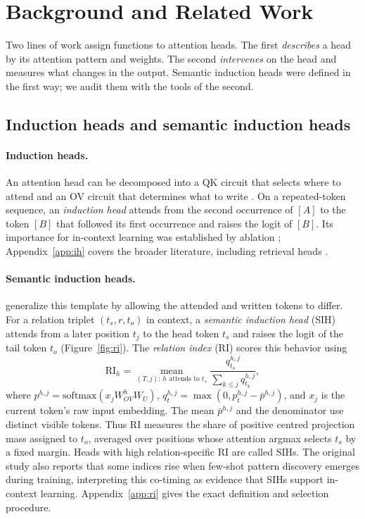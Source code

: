 \section{Background and Related Work}
\label{sec:background}

Two lines of work assign functions to attention heads. The first \emph{describes} a
head by its attention pattern and weights. The second \emph{intervenes} on the head
and measures what changes in the output. Semantic induction heads were defined in the
first way; we audit them with the tools of the second.

\subsection{Induction heads and semantic induction heads}
\label{sec:sih}

\paragraph{Induction heads.}
An attention head can be decomposed into a QK circuit that selects where to attend
and an OV circuit that determines what to write
\citep{elhage2021mathematical}. On a repeated-token sequence, an
\emph{induction head} attends from the second occurrence of $[A]$ to the token
$[B]$ that followed its first occurrence and raises the logit of $[B]$.
Its importance for in-context learning was established by ablation
\citep{olsson2022induction}; Appendix~\ref{app:ih} covers the broader literature,
including retrieval heads \citep{wu2024retrieval}.

\paragraph{Semantic induction heads.}
\citet{ren2024semantic} generalize this template by allowing the attended and
written tokens to differ. For a relation triplet $(t_s,r,t_o)$ in context, a
\emph{semantic induction head} (SIH) attends from a later position $t_j$ to the
head token $t_s$ and raises the logit of the tail token $t_o$
(Figure~\ref{fig:ri}). The \emph{relation index} (RI) scores this behavior using
\begin{equation}
\label{eq:ri}
\mathrm{RI}_h
=\operatorname*{mean}_{(T,j):\,h\text{ attends to }t_s}
\frac{q^{h,j}_{t_o}}{\sum_{k\le j}q^{h,j}_{t_k}},
\end{equation}
where
$p^{h,j}=\mathrm{softmax}(x_jW^h_{OV}W_U)$,
$q^{h,j}_t=\max(0,p^{h,j}_t-\bar p^{h,j})$, and $x_j$ is the current token's
raw input embedding. The mean $\bar p^{h,j}$ and the denominator use distinct
visible tokens.
Thus RI measures the share of positive centred projection
mass assigned to $t_o$, averaged over positions whose attention argmax selects
$t_s$ by a fixed margin. Heads with high relation-specific RI are called SIHs.
The original study also reports that some indices rise when few-shot pattern
discovery emerges during training, interpreting this co-timing as evidence that
SIHs support in-context learning. Appendix~\ref{app:ri} gives the exact
definition and selection procedure.

